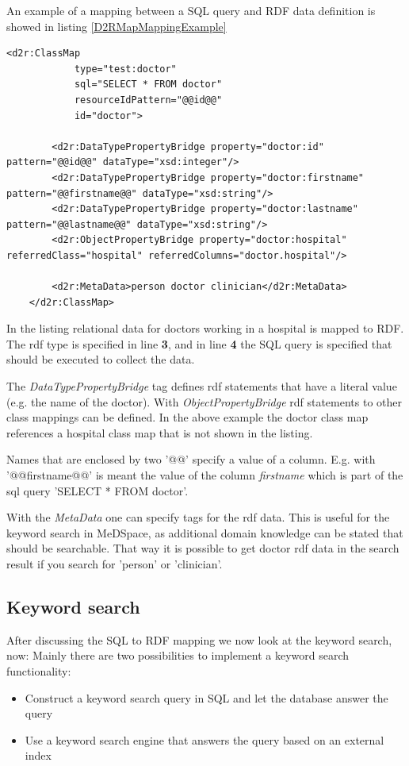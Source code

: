 An example of a mapping between a SQL query and RDF data definition is showed in listing \ref{D2RMapMappingExample}

\begin{lstlisting}[style=RdfCodeStyle, caption=Example of a MeDSpace D2rMap mapping, label=D2RMapMappingExample]
<d2r:ClassMap
			type="test:doctor"
			sql="SELECT * FROM doctor"
			resourceIdPattern="@@id@@"
			id="doctor">

		<d2r:DataTypePropertyBridge property="doctor:id" pattern="@@id@@" dataType="xsd:integer"/>
		<d2r:DataTypePropertyBridge property="doctor:firstname" pattern="@@firstname@@" dataType="xsd:string"/>
		<d2r:DataTypePropertyBridge property="doctor:lastname" pattern="@@lastname@@" dataType="xsd:string"/>
		<d2r:ObjectPropertyBridge property="doctor:hospital" referredClass="hospital" referredColumns="doctor.hospital"/>

		<d2r:MetaData>person doctor clinician</d2r:MetaData>
	</d2r:ClassMap>

\end{lstlisting}

In the listing relational data for doctors working in a hospital is mapped to RDF. The rdf type is specified in line \textbf{3}, and in line \textbf{4} the SQL query is specified that should be executed to collect the data. 

The \emph{DataTypePropertyBridge} tag defines rdf statements that have a literal value (e.g. the name of the doctor). 
With \emph{ObjectPropertyBridge} rdf statements to other class mappings can be defined. In the above example the doctor class map references a hospital class map that is not shown in the listing. 

Names that are enclosed by two '@@' specify a value of a column. E.g. with '@@firstname@@' is meant the value of the column \emph{firstname} which is part of the sql query 'SELECT * FROM doctor'.

With the \emph{MetaData} one can specify tags for the rdf data. This is useful for the keyword search in MeDSpace, as additional domain knowledge can be stated that should be searchable. That way it is possible to get doctor rdf data in the search result if you search for 'person' or 'clinician'. 

\subsection{Keyword search}

After discussing the SQL to RDF mapping we now look at the keyword search, now:
Mainly there are two possibilities to implement a keyword search functionality:
\begin{itemize}
	\item {Construct a keyword search query in SQL and let the database answer the query}
	
	\item {Use a keyword search engine that answers the query based on an external index}
\end{itemize}

